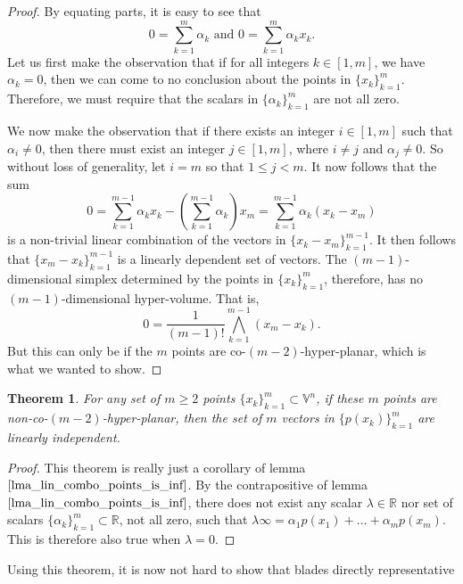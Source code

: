 \documentclass[12pt]{article}
\newcommand{\V}{\mathbb{V}}
\newcommand{\R}{\mathbb{R}}
\newcommand{\nvai}{\infty}
\newtheorem{theorem}{Theorem}[section]
\begin{document}
\begin{proof}
By equating parts, it is easy to see that
\begin{equation*}
\mbox{$\displaystyle{0=\sum_{k=1}^m\alpha_k}$ and $\displaystyle{0=\sum_{k=1}^m\alpha_k x_k}$.}
\end{equation*}
Let us first make the observation that if for all integers $k\in[1,m]$, we have
$\alpha_k=0$, then we can come to no conclusion about the points in $\{x_k\}_{k=1}^m$.
Therefore, we must require that the scalars in $\{\alpha_k\}_{k=1}^m$ are not
all zero.

We now make the observation that if there exists an integer $i\in[1,m]$ such that
$\alpha_i\neq 0$, then there must exist an integer $j\in[1,m]$, where $i\neq j$ and
$\alpha_j\neq 0$.
So without loss of generality, let $i=m$ so that $1\leq j<m$.
It now follows that the sum
\begin{equation*}
0 = \sum_{k=1}^{m-1}\alpha_k x_k - \left(\sum_{k=1}^{m-1}\alpha_k\right)x_m
 = \sum_{k=1}^{m-1}\alpha_k(x_k-x_m)
\end{equation*}
is a non-trivial linear combination of the vectors in $\{x_k-x_m\}_{k=1}^{m-1}$.
It then follows that $\{x_m-x_k\}_{k=1}^{m-1}$ is a linearly dependent set of vectors.
The $(m-1)$-dimensional simplex determined by the points in $\{x_k\}_{k=1}^m$, therefore,
has no $(m-1)$-dimensional hyper-volume.  That is,
\begin{equation*}
0=\frac{1}{(m-1)!}\bigwedge_{k=1}^{m-1}(x_m-x_k).
\end{equation*}
But this can only be if the $m$ points are co-$(m-2)$-hyper-planar,
which is what we wanted to show.
\end{proof}
\begin{theorem}\label{thm_fit_round}
For any set of $m\geq 2$ points $\{x_k\}_{k=1}^m\subset\V^n$, if these
$m$ points are non-co-$(m-2)$-hyper-planar, then the set of $m$ vectors in $\{p(x_k)\}_{k=1}^m$
are linearly independent.
\end{theorem}
\begin{proof}
This theorem is really just a corollary of lemma $\eqref{lma_lin_combo_points_is_inf}$.
By the contrapositive of lemma $\eqref{lma_lin_combo_points_is_inf}$, there does not
exist any scalar $\lambda\in\R$ nor set of scalars $\{\alpha_k\}_{k=1}^m\subset\R$, not all zero, such
that $\lambda\nvai = \alpha_1 p(x_1)+\dots+\alpha_mp(x_m)$.  This is therefore also true when $\lambda=0$.
\end{proof}
Using this theorem, it is now not hard to show that blades directly representative
\end{document}
